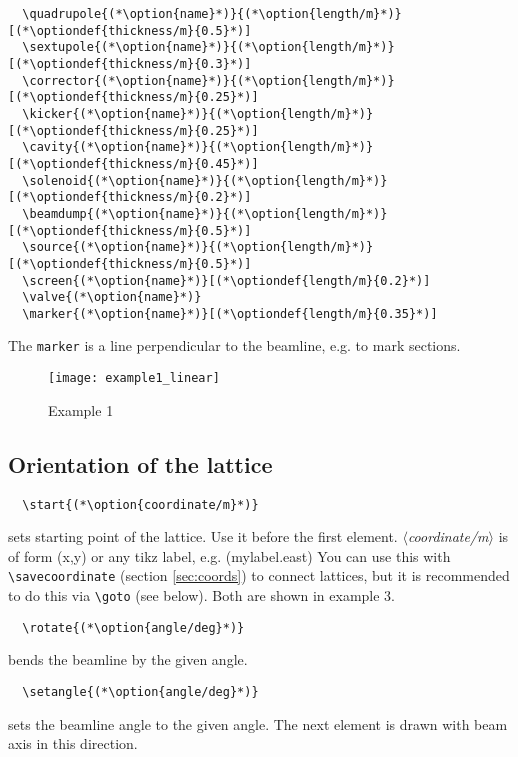 \documentclass[a4paper]{scrartcl}
\newcommand{\option}[1]{{\color{blue}$\langle$\textit{#1}$\rangle$}}
\newcommand{\optiondef}[2]{{\color{green!50!black}$\langle$\textit{#1=#2}$\rangle$}}
\begin{document}
\begin{lstlisting}
  \quadrupole{(*\option{name}*)}{(*\option{length/m}*)}[(*\optiondef{thickness/m}{0.5}*)]
  \sextupole{(*\option{name}*)}{(*\option{length/m}*)}[(*\optiondef{thickness/m}{0.3}*)]
  \corrector{(*\option{name}*)}{(*\option{length/m}*)}[(*\optiondef{thickness/m}{0.25}*)]
  \kicker{(*\option{name}*)}{(*\option{length/m}*)}[(*\optiondef{thickness/m}{0.25}*)]
  \cavity{(*\option{name}*)}{(*\option{length/m}*)}[(*\optiondef{thickness/m}{0.45}*)]
  \solenoid{(*\option{name}*)}{(*\option{length/m}*)}[(*\optiondef{thickness/m}{0.2}*)]
  \beamdump{(*\option{name}*)}{(*\option{length/m}*)}[(*\optiondef{thickness/m}{0.5}*)]
  \source{(*\option{name}*)}{(*\option{length/m}*)}[(*\optiondef{thickness/m}{0.5}*)]
  \screen{(*\option{name}*)}[(*\optiondef{length/m}{0.2}*)]
  \valve{(*\option{name}*)}
  \marker{(*\option{name}*)}[(*\optiondef{length/m}{0.35}*)]
\end{lstlisting}
The \lstinline+marker+ is a line perpendicular to the beamline, e.g. to mark sections.

\begin{figure}[h]
  \centering
  \texttt{[image: example1\_linear]}
  \caption{Example 1}
  \label{fig:example1}
\end{figure}


\subsection{Orientation of the lattice}
\label{sec-5-2}

\begin{lstlisting}
  \start{(*\option{coordinate/m}*)}
\end{lstlisting}
sets starting point of the lattice. Use it before the first element. \option{coordinate/m}
is of form (x,y) or any tikz label, e.g. (mylabel.east) You can use this with
\lstinline+\savecoordinate+ (section \ref{sec:coords}) to connect lattices, but it is
recommended to do this via \lstinline+\goto+ (see below). Both are shown in example 3.

\begin{lstlisting}
  \rotate{(*\option{angle/deg}*)}
\end{lstlisting}
bends the beamline by the given angle.

\begin{lstlisting}
  \setangle{(*\option{angle/deg}*)}
\end{lstlisting}
sets the beamline angle to the given angle. The next element is drawn with beam axis in
this direction.
\end{document}
